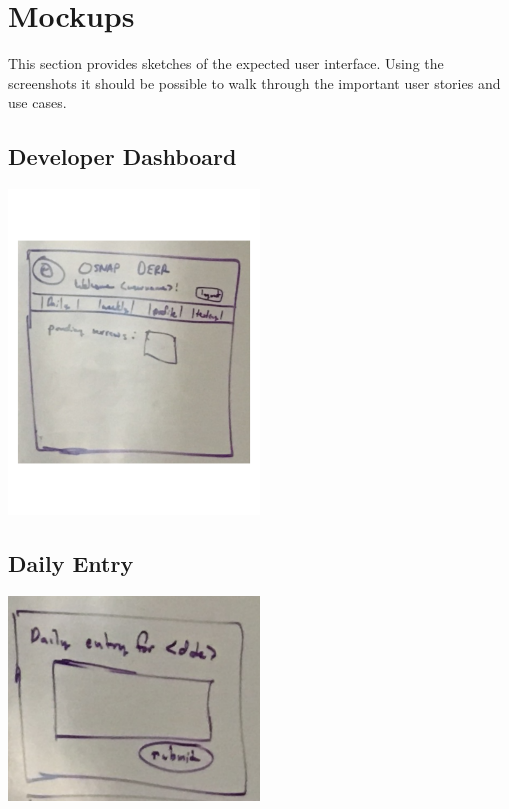 \chapter*{Mockups}
This section provides sketches of the expected user interface. Using the screenshots it should be possible to walk through the important user stories and use cases.

\section*{Developer Dashboard}
\begin{center}
\includegraphics[width=0.5\textwidth]{./mocks/dashboard.pdf}
\end{center}


\section*{Daily Entry}
\begin{center}
\includegraphics[width=0.5\textwidth]{./mocks/daily_entry.pdf}
\end{center}

